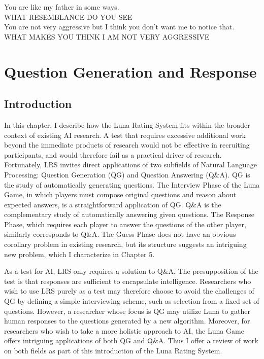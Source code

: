 \begin{savequote}[75mm]
You are like my father in some ways.\\
WHAT RESEMBLANCE DO YOU SEE\\
You are not very aggressive but I think you don't want me to notice that.\\
WHAT MAKES YOU THINK I AM NOT VERY AGGRESSIVE
\author{A conversation with ELIZA (from Weizenbaum 1966)}
\end{savequote}
\chapter{Question Generation and Response}

\section{Introduction}

In this chapter, I describe how the Luna Rating System fits within the broader context of existing AI research. A test that requires excessive additional work beyond the immediate products of research would not be effective in recruiting participants, and would therefore fail as a practical driver of research. Fortunately, LRS invites direct applications of two subfields of Natural Language Processing: Question Generation (QG) and Question Answering (Q\&A). QG is the study of automatically generating questions. The Interview Phase of the Luna Game, in which players must compose original questions and reason about expected answers, is a straightforward application of QG. Q\&A is the complementary study of automatically answering given questions. The Response Phase, which requires each player to answer the questions of the other player, similarly corresponds to Q\&A. The Guess Phase does not have an obvious corollary problem in existing research, but its structure suggests an intriguing new problem, which I characterize in Chapter 5.

As a test for AI, LRS only requires a solution to Q\&A. The presupposition of the test is that responses are sufficient to encapsulate intelligence. Researchers who wish to use LRS purely as a test may therefore choose to avoid the challenges of QG by defining a simple interviewing scheme, such as selection from a fixed set of questions. However, a researcher whose focus is QG may utilize Luna to gather human responses to the questions generated by a new algorithm. Moreover, for researchers who wish to take a more holistic approach to AI, the Luna Game offers intriguing applications of both QG and Q\&A. Thus I offer a review of work on both fields as part of this introduction of the Luna Rating System.

